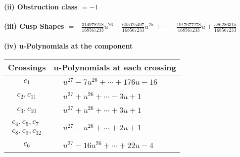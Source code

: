 \documentclass[1p]{elsarticle_modified}
\theoremstyle{definition}
\begin{document}
\flushleft \textbf{(ii) Obstruction class $= -1$}\\~\\
\flushleft \textbf{(iii) Cusp Shapes $= -\frac{314978218}{168567233} u^{26}-\frac{605025497}{168567233} u^{25}+\cdots-\frac{1917677278}{168567233} u+\frac{586286315}{168567233}$}\\~\\
\newpage\renewcommand{\arraystretch}{1}
\flushleft \textbf{(iv) u-Polynomials at the component}\newline \\
\begin{tabular}{m{50pt}|m{274pt}}
Crossings & \hspace{64pt}u-Polynomials at each crossing \\
\hline $$\begin{aligned}c_{1}\end{aligned}$$&$\begin{aligned}
&u^{27}-7 u^{26}+\cdots+176 u-16
\end{aligned}$\\
\hline $$\begin{aligned}c_{2},c_{11}\end{aligned}$$&$\begin{aligned}
&u^{27}+u^{26}+\cdots-3 u+1
\end{aligned}$\\
\hline $$\begin{aligned}c_{3},c_{10}\end{aligned}$$&$\begin{aligned}
&u^{27}+u^{26}+\cdots+3 u+1
\end{aligned}$\\
\hline $$\begin{aligned}c_{4},c_{5},c_{7}\\c_{8},c_{9},c_{12}\end{aligned}$$&$\begin{aligned}
&u^{27}- u^{26}+\cdots+2 u+1
\end{aligned}$\\
\hline $$\begin{aligned}c_{6}\end{aligned}$$&$\begin{aligned}
&u^{27}-16 u^{26}+\cdots+22 u-4
\end{aligned}$\\
\hline
\end{tabular}\\~\\
\newpage\renewcommand{\arraystretch}{1}
\end{document}
